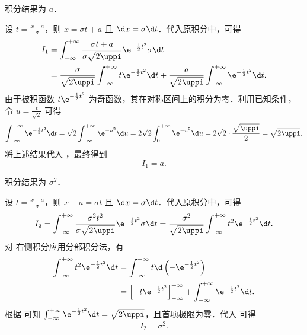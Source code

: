 \begin{solution}
     积分结果为 $a$．

    设 $t = \frac{x-a}{\sigma}$，则 $x = \sigma t + a$ 且 $\d x = \sigma \d t$．代入原积分中，可得
    \begin{equation}\label{eq:int1-1}
        \begin{aligned}
            I_1 & = \int_{-\infty}^{+\infty} \frac{\sigma t + a}{\sigma \sqrt{2\uppi}} \e^{-\frac{1}{2}t^2} \sigma \d t                                                             \\
                & = \frac{\sigma}{\sqrt{2\uppi}} \int_{-\infty}^{+\infty} t \e^{-\frac{1}{2}t^2} \d t + \frac{a}{\sqrt{2\uppi}} \int_{-\infty}^{+\infty} \e^{-\frac{1}{2}t^2} \d t.
        \end{aligned}
    \end{equation}
    由于被积函数 $t \e^{-\frac{1}{2}t^2}$ 为奇函数，其在对称区间上的积分为零．利用已知条件，令 $u = \frac{t}{\sqrt{2}}$ 可得
    \begin{equation}\label{eq:int1-2}
        \int_{-\infty}^{+\infty} \e^{-\frac{1}{2}t^2} \d t = \sqrt{2} \int_{-\infty}^{+\infty} \e^{-u^2} \d u = 2\sqrt{2} \int_{0}^{+\infty} \e^{-u^2} \d u = 2\sqrt{2} \cdot \frac{\sqrt{\uppi}}{2} = \sqrt{2\uppi}.
    \end{equation}
    将上述结果代入 ，最终得到
    \begin{equation}
        I_1 = \boxed{a}.
    \end{equation}

     积分结果为 $\sigma^2$．

    设 $t = \frac{x-a}{\sigma}$，则 $x-a = \sigma t$ 且 $\d x = \sigma \d t$．代入原积分中，可得
    \begin{equation}\label{eq:int2-1}
        I_2 = \int_{-\infty}^{+\infty} \frac{\sigma^2 t^2}{\sigma \sqrt{2\uppi}} \e^{-\frac{1}{2}t^2} \sigma \d t = \frac{\sigma^2}{\sqrt{2\uppi}} \int_{-\infty}^{+\infty} t^2 \e^{-\frac{1}{2}t^2} \d t.
    \end{equation}
    对  右侧积分应用分部积分法，有
    \begin{equation}\label{eq:int2-2}
        \begin{aligned}
            \int_{-\infty}^{+\infty} t^2 \e^{-\frac{1}{2}t^2} \d t & = \int_{-\infty}^{+\infty} t \d \left( -\e^{-\frac{1}{2}t^2} \right)                                               \\
                                                                   & = \left[ -t \e^{-\frac{1}{2}t^2} \right]_{-\infty}^{+\infty} + \int_{-\infty}^{+\infty} \e^{-\frac{1}{2}t^2} \d t.
        \end{aligned}
    \end{equation}
    根据  可知 $\int_{-\infty}^{+\infty} \e^{-\frac{1}{2}t^2} \d t = \sqrt{2\uppi}$，且首项极限为零．代入  可得
    \begin{equation}
        I_2 = \boxed{\sigma^2}.
    \end{equation}


\end{solution}
